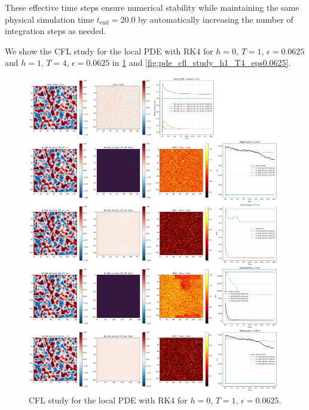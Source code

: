 \documentclass[11pt,a4paper]{article}
\begin{document}
These effective time steps ensure numerical stability while maintaining the same physical simulation time $t_\text{end} = 20.0$ by automatically increasing the number of integration steps as needed.

We show the CFL study for the local PDE with RK4 for $h=0$, $T=1$, $\epsilon=0.0625$ and $h=1$, $T=4$, $\epsilon=0.0625$ in \cref{fig:pde_cfl_study_h0_T1_eps0.0625} and \cref{fig:pde_cfl_study_h1_T4_eps0.0625}.

\begin{figure}[!h]
    \centering
    \includegraphics[width=1.0\textwidth]{fig/pde_cfl_study_poly_h=0_T=1_eps=0.0625_L=1024.png}
    \caption{CFL study for the local PDE with RK4 for $h=0$, $T=1$, $\epsilon=0.0625$.}
    \label{fig:pde_cfl_study_h0_T1_eps0.0625}
\end{figure}
\end{document}
